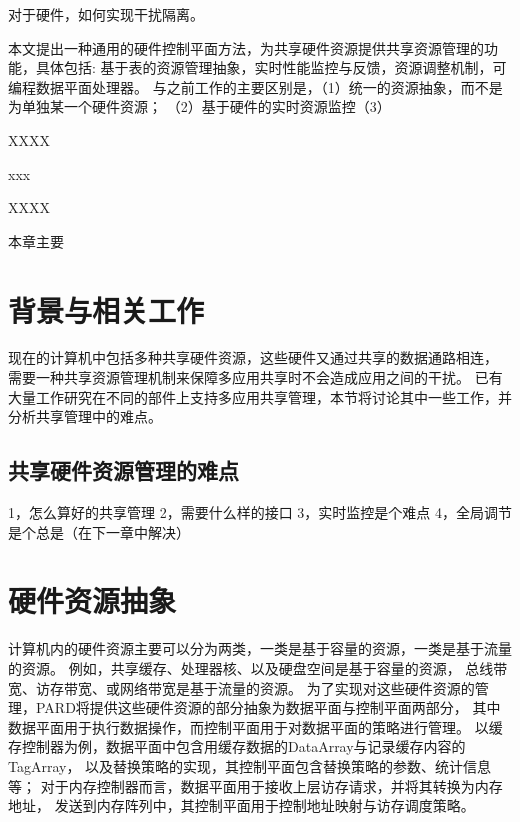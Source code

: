 对于硬件，如何实现干扰隔离。 %

本文提出一种通用的硬件控制平面方法，为共享硬件资源提供共享资源管理的功能，具体包括:
基于表的资源管理抽象，实时性能监控与反馈，资源调整机制，可编程数据平面处理器。
与之前工作的主要区别是，（1）统一的资源抽象，而不是为单独某一个硬件资源；
（2）基于硬件的实时资源监控（3）

XXXX

xxx

XXXX

本章主要




\section{背景与相关工作}

现在的计算机中包括多种共享硬件资源，这些硬件又通过共享的数据通路相连，
需要一种共享资源管理机制来保障多应用共享时不会造成应用之间的干扰。
已有大量工作研究在不同的部件上支持多应用共享管理，本节将讨论其中一些工作，并分析共享管理中的难点。


\subsection{共享硬件资源管理的难点}
1，怎么算好的共享管理
2，需要什么样的接口
3，实时监控是个难点
4，全局调节是个总是（在下一章中解决）

\section{硬件资源抽象}

计算机内的硬件资源主要可以分为两类，一类是基于容量的资源，一类是基于流量的资源。
例如，共享缓存、处理器核、以及硬盘空间是基于容量的资源，
总线带宽、访存带宽、或网络带宽是基于流量的资源。
为了实现对这些硬件资源的管理，PARD将提供这些硬件资源的部分抽象为数据平面与控制平面两部分，
其中数据平面用于执行数据操作，而控制平面用于对数据平面的策略进行管理。
以缓存控制器为例，数据平面中包含用缓存数据的DataArray与记录缓存内容的TagArray，
以及替换策略的实现，其控制平面包含替换策略的参数、统计信息等；
对于内存控制器而言，数据平面用于接收上层访存请求，并将其转换为内存地址，
发送到内存阵列中，其控制平面用于控制地址映射与访存调度策略。


